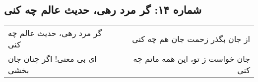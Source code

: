\begin{center}
\section*{شماره ۱۴: گر مرد رهی، حدیث عالم چه کنی}
\label{sec:014}
\begin{longtable}{l p{0.5cm} r}
گر مرد رهی، حدیث عالم چه کنی
&&
از جان بگذر زحمت جان هم چه کنی
\\
ای بی معنی! اگر چنان جان بخشی
&&
جان خواست ز تو، این همه ماتم چه کنی
\\
\end{longtable}
\end{center}
